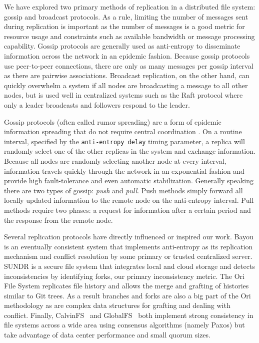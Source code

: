 \documentclass{article}
\begin{document}
We have explored two primary methods of replication in a distributed file system: gossip and broadcast protocols. As a rule, limiting the number of messages sent during replication is important as the number of messages is a good metric for resource usage and constraints such as available bandwidth or message processing capability. Gossip protocols are generally used as anti-entropy to disseminate information across the network in an epidemic fashion. Because gossip protocols use peer-to-peer connections, there are only as many messages per gossip interval as there are pairwise associations. Broadcast replication, on the other hand, can quickly overwhelm a system if all nodes are broadcasting a message to all other nodes, but is used well in centralized systems such as the Raft protocol where only a leader broadcasts and followers respond to the leader.

Gossip protocols (often called rumor spreading) are a form of epidemic information spreading that do not require central coordination \cite{kempe_gossip-based_2003, karp_randomized_2000}. On a routine interval, specified by the \texttt{anti-entropy delay} timing parameter, a replica will randomly select one of the other replicas in the system and exchange information. Because all nodes are randomly selecting another node at every interval, information travels quickly through the network in an exponential fashion and provide high fault-tolerance and even automatic stabilization. Generally speaking there are two types of gossip: \textit{push} and \textit{pull}. Push methods simply forward all locally updated information to the remote node on the anti-entropy interval. Pull methods require two phases: a request for information after a certain period and the response from the remote node.

Several replication protocols have directly influenced or inspired our work. Bayou \cite{terry_managing_1995,terry_session_1994} is an eventually consistent system that implements anti-entropy as its replication mechanism and conflict resolution by some primary or trusted centralized server. SUNDR \cite{li_secure_2004} is a secure file system that integrates local and cloud storage and detects inconsistencies by identifying forks, our primary inconsistency metric. The Ori File System \cite{mashtizadeh_replication_2013} replicates file history and allows the merge and grafting of histories similar to Git trees. As a result branches and forks are also a big part of the Ori methodology as are complex data structures for grafting and dealing with conflict. Finally, CalvinFS~\cite{calvinfs} and GlobalFS~\cite{globalfs} both implement strong consistency in file systems across a wide area using consensus algorithms (namely Paxos) but take advantage of data center performance and small quorum sizes.
\end{document}
